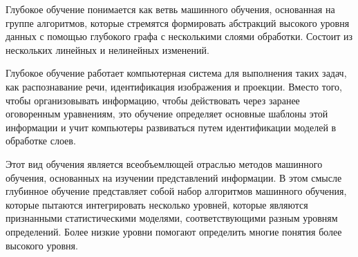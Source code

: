 Глубокое обучение понимается как ветвь машинного обучения, основанная на группе алгоритмов,
которые стремятся формировать абстракций высокого уровня данных с помощью глубокого графа с несколькими слоями обработки.
Состоит из нескольких линейных и нелинейных изменений.

Глубокое обучение работает компьютерная система для выполнения таких задач, как распознавание речи, идентификация изображения и проекции.
Вместо того, чтобы организовывать информацию, чтобы действовать через заранее оговоренным уравнениям,
это обучение определяет основные шаблоны этой информации и учит компьютеры развиваться путем идентификации моделей в обработке слоев.

Этот вид обучения является всеобъемлющей отраслью методов машинного обучения,
основанных на изучении представлений информации.
В этом смысле глубинное обучение представляет собой набор алгоритмов машинного обучения,
которые пытаются интегрировать несколько уровней,
которые являются признанными статистическими моделями,
соответствующими разным уровням определений.
Более низкие уровни помогают определить многие понятия более высокого уровня.